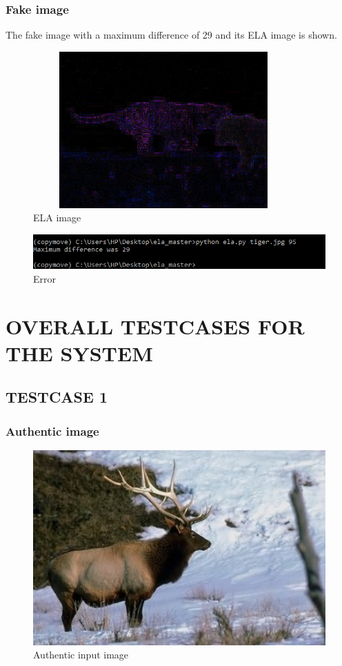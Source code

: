 \subsubsection{Fake image}
     The fake image with a maximum difference of 29 and its ELA image is shown.
\begin{figure}[h!]
\centering
\includegraphics[width=10cm,height=6cm]{Figures/tiger_ela.png}
\caption{ELA image}
\label{fig:lion}
\end{figure}
     
\begin{figure}[h!]
\centering
\includegraphics[width=16cm]{Figures/ela-cmd.PNG}
\caption{Error}
\label{fig:lion}
\end{figure}
\newpage

\section{OVERALL TESTCASES FOR THE SYSTEM}

\subsection{TESTCASE 1}
\subsubsection{Authentic image}
\begin{figure}[htp]
\centering
\includegraphics[width=13cm]{Figures/Au_ani_00021.jpg}
\caption{Authentic input image}
\label{fig:lion}
\end{figure}

